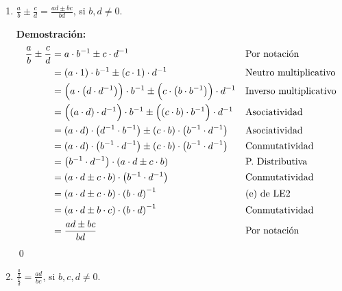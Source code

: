 \documentclass[11pt]{article}
\begin{document}
\begin{enumerate}[label=\alph*)]
    \item $\frac{a}{b} \pm \frac{c}{d} = \frac{ad \pm bc}{bd} $, si $b, d \neq 0$.
    
    \textbf{Demostración:}\begin{align*}
    \frac{a}{b} \pm \frac{c}{d}  &=	a \cdot b^{-1} \pm c \cdot d^{-1} && \text{Por notación}\\
    &=	\left( a \cdot 1 \right)   \cdot b^{-1} \pm \left( c \cdot 1 \right) \cdot d^{-1} && \text{Neutro multiplicativo}\\
    &=	\Bigl( a \cdot  \left( d \cdot d^{-1} \right) \Bigr) \cdot b^{-1} \pm \Bigl( c \cdot  \left( b \cdot b^{-1}  \right)  \Bigr)  \cdot d^{-1} && \text{Inverso multiplicativo}\\
    &=	\Bigl(  \left( a \cdot d \right) \cdot d^{-1} \Bigr) \cdot b^{-1} \pm \Bigl(  \left( c \cdot b \right) \cdot b^{-1} \Bigr) \cdot d^{-1} && \text{Asociatividad}\\
    &=	\left( a \cdot d \right)  \cdot  \left( d^{-1} \cdot b^{-1}  \right) \pm \left( c \cdot b \right)  \cdot  \left( b^{-1} \cdot d^{-1}  \right) && \text{Asociatividad}\\
    &=	\left( a \cdot d \right)  \cdot  \left( b^{-1} \cdot d^{-1}  \right) \pm \left( c \cdot b \right)  \cdot  \left( b^{-1} \cdot d^{-1}  \right) && \text{Conmutatividad}\\
    &=	\left( b^{-1} \cdot d^{-1}  \right) \cdot \left( a \cdot d \pm c \cdot b \right) && \text{P. Distributiva}\\
    &=	\left( a \cdot d \pm c \cdot b \right) \cdot  \left( b^{-1} \cdot d^{-1} \right) && \text{Conmutatividad}\\
    &=	\left( a \cdot d \pm c \cdot b \right) \cdot  \left( b \cdot d \right)^{-1} && \text{(e) de LE2}\\
    &=	\left( a \cdot d \pm b \cdot c \right) \cdot \left( b \cdot d \right)^{-1} && \text{Conmutatividad}\\
    &=	\frac{ad \pm bc}{bd} && \text{Por notación}
    \end{align*}\qed

    \item $\frac{\frac{a}{b}}{\frac{c}{d}} = \frac{ad}{bc}$, si $b, c, d \neq 0$.
    

\end{enumerate}
\end{document}
